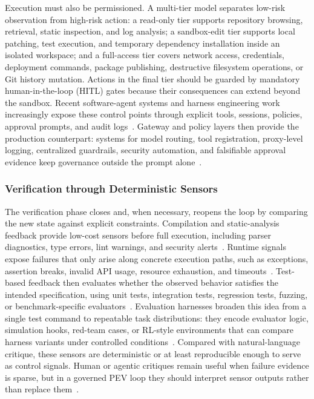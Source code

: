 \documentclass{llmxive}
\begin{document}
Execution must also be permissioned. A multi-tier model separates low-risk observation from high-risk action: a read-only tier supports repository browsing, retrieval, static inspection, and log analysis; a sandbox-edit tier supports local patching, test execution, and temporary dependency installation inside an isolated workspace; and a full-access tier covers network access, credentials, deployment commands, package publishing, destructive filesystem operations, or Git history mutation. Actions in the final tier should be guarded by mandatory human-in-the-loop (HITL) gates because their consequences can extend beyond the sandbox. Recent software-agent systems and harness engineering work increasingly expose these control points through explicit tools, sessions, policies, approval prompts, and audit logs~\cite{sergeyuk2026human, wang2025openhands, lin2026agentic, zhou2026externalization,anthropicclaudecodeautomode2026,anthropicsandboxing2026}. Gateway and policy layers then provide the production counterpart: systems for model routing, tool registration, proxy-level logging, centralized guardrails, security automation, and falsifiable approval evidence keep governance outside the prompt alone~\cite{litellm2026,kong2026,portkey2026,contextforge2026,agentgateway2026,openairealtimeagents2026,openaicsagentsdemo2026,tracecat2026,archestra2026,haft2026}.

\subsubsection{Verification through Deterministic Sensors}

The verification phase closes and, when necessary, reopens the loop by comparing the new state against explicit constraints. Compilation and static-analysis feedback provide low-cost sensors before full execution, including parser diagnostics, type errors, lint warnings, and security alerts~\cite{bi2024iterative, adnan2025debugging, blyth2025static}. Runtime signals expose failures that only arise along concrete execution paths, such as exceptions, assertion breaks, invalid API usage, resource exhaustion, and timeouts~\cite{sun2024llm, huang2025mldebugging, zhong2024debug}. Test-based feedback then evaluates whether the observed behavior satisfies the intended specification, using unit tests, integration tests, regression tests, fuzzing, or benchmark-specific evaluators~\cite{chen2023teaching, fakhoury2024llm, gu2024testart, shi2025from}. Evaluation harnesses broaden this idea from a single test command to repeatable task distributions: they encode evaluator logic, simulation hooks, red-team cases, or RL-style environments that can compare harness variants under controlled conditions~\cite{promptfoo2026,deepeval2026,ragas2026,lmevaluationharness2026,langwatch2026,evalscope2026,harbor2026,tau2bench2026,nemogym2026,agentevaluation2026,inspectevals2026}. Compared with natural-language critique, these sensors are deterministic or at least reproducible enough to serve as control signals. Human or agentic critiques remain useful when failure evidence is sparse, but in a governed PEV loop they should interpret sensor outputs rather than replace them~\cite{shinn2023reflexion, ross2023programmer, wu2024autogen}.
\end{document}
